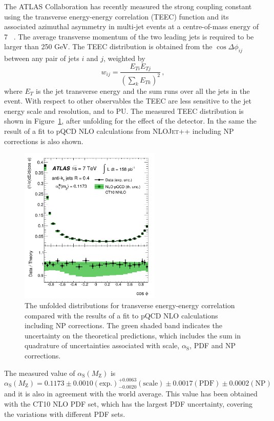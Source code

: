 \documentclass{PoS}
\providecommand{\NLOJETPP} {{\textsc{NLOJet++}}\xspace}
\def\as{\ensuremath{\alpha_\mathrm{S}}\xspace}
\providecommand{\alpsmz}{\ensuremath{\alpha_\mathrm{S}(M_\mathrm{Z})}\xspace}
\begin{document}
The ATLAS Collaboration has recently measured the strong coupling constant using the transverse energy-energy
correlation (TEEC) function and its associated azimuthal asymmetry in multi-jet events at a
centre-of-mass energy of 7 \TeV~\cite{ATLAS:2015yaa}. The average transverse momentum of the two leading jets is
required to be larger than 250 GeV. The TEEC distribution is obtained from the $\cos\Delta\phi_{ij}$ between any pair of
jets $i$ and $j$, weighted by $$w_{ij} = \frac{E_{Ti}E_{Tj}}{(\sum_k E_{Tk})^2} \, ,$$ where $E_T$ is the jet transverse
energy and the sum runs over all the jets in the event. With respect to other observables the TEEC are less sensitive to the jet energy scale and resolution,
and to PU. The measured TEEC distribution is shown in Figure~\ref{fig:TEEC}, after unfolding for the effect of
the detector. In the same the result of a fit to pQCD NLO calculations from \NLOJETPP including NP
corrections is also shown. 
\begin{figure}[hbpt]
  \centering
  \includegraphics[width=0.6\textwidth]{Figure5.pdf}
  \caption{The unfolded distributions for transverse energy-energy correlation compared with the results of a fit to
    pQCD NLO calculations including NP corrections. The green shaded band indicates the uncertainty on the
    theoretical predictions, which includes the sum in quadrature of uncertainties associated with scale, \as, PDF and
    NP corrections.}
  \label{fig:TEEC}
\end{figure}
The measured value of \alpsmz is 
$$ \alpsmz  = 0.1173 \pm 0.0010 \mathrm{(exp.)} ^{+0.0063}_{-0.0020} \mathrm{(scale)} \pm 0.0017 \mathrm{(PDF)} \pm
0.0002 \mathrm{(NP)} \, $$
and it is also in agreement with the world average. This value has been obtained with the CT10 NLO PDF set, which has
the largest PDF uncertainty, covering the variations with different PDF sets.
\end{document}
